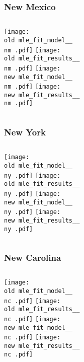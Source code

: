 \documentclass{beamer}
\newcommand{\old}{api-370-prod/pyseir/state_summaries/reports/}
\newcommand{\new}{new/pyseir/state_summaries/reports/}
\newcommand{\nm}{New Mexico__35}
\newcommand{\ny}{New York__36}
\newcommand{\nc}{North Carolina__37}
\begin{document}
\begin{frame}
\frametitle{New Mexico}
    \begin{columns}[t]

       \texttt{[image: \\old mle\_fit\_model\_\_\\nm .pdf]}
       \texttt{[image: \\old mle\_fit\_results\_\_\\nm .pdf]}   
       \texttt{[image: \\new mle\_fit\_model\_\_\\nm .pdf]}
       \texttt{[image: \\new mle\_fit\_results\_\_\\nm .pdf]}   
\end{columns}
\end{frame}

\begin{frame}
\frametitle{New York}
    \begin{columns}[t]

       \texttt{[image: \\old mle\_fit\_model\_\_\\ny .pdf]}
       \texttt{[image: \\old mle\_fit\_results\_\_\\ny .pdf]}   
       \texttt{[image: \\new mle\_fit\_model\_\_\\ny .pdf]}
       \texttt{[image: \\new mle\_fit\_results\_\_\\ny .pdf]}   
\end{columns}
\end{frame}

\begin{frame}
\frametitle{New Carolina}
    \begin{columns}[t]

       \texttt{[image: \\old mle\_fit\_model\_\_\\nc .pdf]}
       \texttt{[image: \\old mle\_fit\_results\_\_\\nc .pdf]}   
       \texttt{[image: \\new mle\_fit\_model\_\_\\nc .pdf]}
       \texttt{[image: \\new mle\_fit\_results\_\_\\nc .pdf]}   
\end{columns}
\end{frame}
\end{document}
